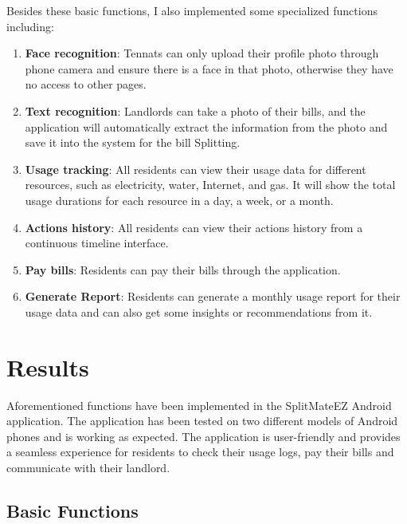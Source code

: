 \documentclass[sigconf,nonacm]{acmart}\settopmatter{printfolios=true}
\begin{document}
Besides these basic functions, I also implemented some specialized functions including: 
\begin{enumerate}
  \item \textbf{Face recognition}: Tennats can only upload their profile photo through phone camera and ensure there is a face in that photo, otherwise they have no access to other pages.
  \item \textbf{Text recognition}: Landlords can take a photo of their bills, and the application will automatically extract the information from the photo and save it into the system for the bill Splitting.
  \item \textbf{Usage tracking}: All residents can view their usage data for different resources, such as electricity, water, Internet, and gas. It will show the total usage durations for each resource in a day, a week, or a month.
  \item \textbf{Actions history}: All residents can view their actions history from a continuous timeline interface.
  \item \textbf{Pay bills}: Residents can pay their bills through the application.
  \item \textbf{Generate Report}: Residents can generate a monthly usage report for their usage data and can also get some insights or recommendations from it.
\end{enumerate}


\section{Results}
Aforementioned functions have been implemented in the SplitMateEZ Android application. The application has been tested on two different models of Android phones and is working as expected. The application is user-friendly and provides a seamless experience for residents to check their usage logs, pay their bills and communicate with their landlord.
\subsection{Basic Functions}
\end{document}
